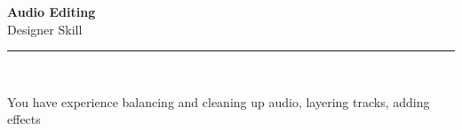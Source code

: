 \documentclass[11pt,a4paper]{memoir}
\begin{document}
    \begin{Spacing}{0.75}%
        \noindent
        \Large
        \textbf{Audio Editing}\\[3pt]
        \scriptsize\color{gray}Designer Skill\\ 
        \rule{\textwidth}{.3mm}\\
        
        \vspace{3mm}
        \noindent
        \begin{minipage}[t]{53mm}
            \begin{flushleft}
            {
                \normalsize
                \begin{Spacing}{1}%
                \color{black}\textrm{You have experience balancing and cleaning up audio, layering tracks, adding effects}\\
                \end{Spacing}
            }
            \end{flushleft}
        \end{minipage}

        \vspace{5mm}
        \noindent
        \begin{minipage}[t]{53mm}
            \begin{flushleft}
            {
                \normalsize
                \begin{Spacing}{1}%
                \color{gray}\textit{}\\
                \end{Spacing}
            }
            \end{flushleft}
        \end{minipage}
    \end{Spacing}
    \clearpage
\end{document}
